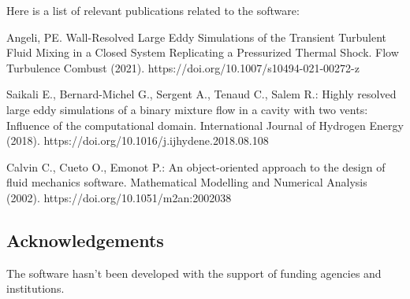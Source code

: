 Here is a list of relevant publications related to the software:

Angeli, PE. Wall-Resolved Large Eddy Simulations of the Transient Turbulent Fluid Mixing in a Closed System Replicating a Pressurized Thermal Shock. Flow Turbulence Combust (2021). 
https://doi.org/10.1007/s10494-021-00272-z

Saikali E., Bernard-Michel G., Sergent A., Tenaud C., Salem R.: Highly resolved large eddy simulations of a binary mixture flow in a cavity with two vents: Influence of the computational domain. International Journal of Hydrogen Energy (2018).
https://doi.org/10.1016/j.ijhydene.2018.08.108

Calvin C., Cueto O., Emonot P.: An object-oriented approach to the design of fluid mechanics software. Mathematical Modelling and Numerical Analysis (2002). 
https://doi.org/10.1051/m2an:2002038 

\subsection{Acknowledgements}
\label{sec::TRUST Platform:acknowledgements}

The software hasn't been developed with the support of funding agencies and institutions. 

